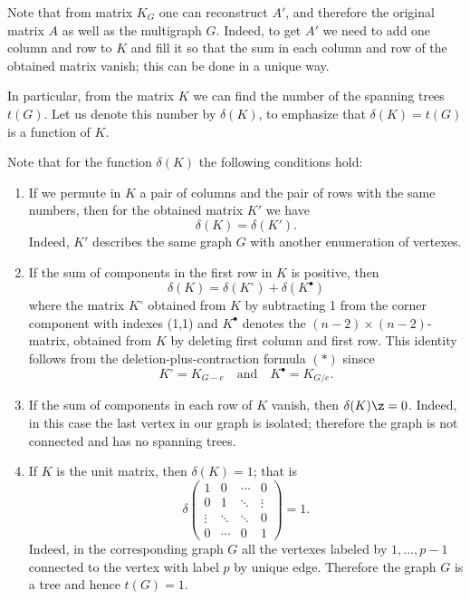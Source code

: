 Note that from matrix $K_G$ one can reconstruct $A'$, and therefore the original matrix $A$ as well as the multigraph $G$.
Indeed, to get $A'$ we need to add one column and row to $K$ and fill it so that the sum in each column and row of the obtained matrix vanish;
this can be done in a unique way.

In particular, from the matrix $K$ we can find the number of the spanning trees $t(G)$.
Let us denote this number by $\delta(K)$, to emphasize that $\delta(K)=t(G)$ is a function of $K$.

Note that for the function $\delta(K)$ the following conditions hold:
\begin{enumerate}
\item\label{delata-1} If we permute in $K$ a pair of columns and the pair of rows with the same numbers, then for the obtained matrix $K'$ we have 
\[\delta(K)=\delta(K').\]
Indeed, $K'$ describes the same graph $G$ with another enumeration of vertexes.

\item \label{delata-2}
If the sum of components in the first row in $K$ is positive, then
\[\delta(K)=\delta(K^{\circ})+\delta(K^{\bullet})\]
where the matrix $K^{\circ}$ obtained from $K$ by subtracting 1 from the corner component with indexes (1,1) and $K^{\bullet}$ denotes the $(n-2)\times(n-2)$-matrix, obtained from $K$ by deleting first column and first row.
This identity follows from the deletion-plus-contraction formula $({*})$ sinsce \[K^{\circ}=K_{G- e}\quad\text{and}\quad K^{\bullet}=K_{G/e}.\]

\item\label{delata-3} If the sum of components in each row of $K$ vanish, then $\delta(K)\z=0$. 
Indeed, in this case the last vertex in our graph is isolated;
therefore the graph is not connected and has no spanning trees.

\item\label{delata-4} If $K$ is the unit matrix, then $\delta(K)=1$;
that is
\[
\delta\left(
\begin{matrix}
1&0&\cdots&0
\\
0&1&\ddots&\vdots
\\
\vdots&\ddots&\ddots&0
\\
0&\cdots&0&1
\end{matrix}
\right)=1.
\]
Indeed, in the corresponding graph $G$ all the vertexes labeled by $1,\dots,p-1$ connected to the vertex with label $p$ by unique edge. 
Therefore the graph $G$ is a tree and hence $t(G)=1$.
\end{enumerate}

